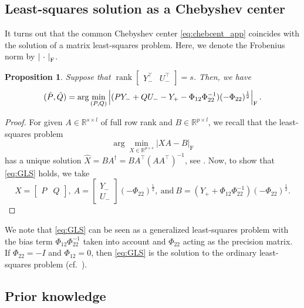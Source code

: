 \documentclass[pdflatex,sn-mathphys-num]{sn-jnl}%
\DeclareMathOperator{\rank}{rank}
\newcommand{\norm}[1]{\left|#1\right|}
\theoremstyle{thmstyleone}
\newtheorem{proposition}[theorem]{Proposition}
\begin{document}
\subsection{Least-squares solution as a Chebyshev center}
\label{subsec:LS}

It turns out that the common Chebyshev center \eqref{eq:chebcent_app} coincides with the solution of a matrix least-squares problem. Here, we denote the Frobenius norm by $\norm{\ \cdot\ }_\textup{F}$.
\begin{proposition}
Suppose that $\rank\begin{bmatrix}
Y_-^\top & U_-^\top
\end{bmatrix}=s$. Then, we have
\begin{equation}
\label{eq:GLS}
(\hat{P},\hat{Q})=\arg\min_{(P,Q)} \norm{(PY_-+QU_--Y_+-\Phi_{12}\Phi_{22}^{-1}) (-\Phi_{22})^{\frac{1}{2}}}_{\textup{F}}.
\end{equation}
\end{proposition}
\begin{proof}
For given $A\in\mathbb{R}^{s\times l}$ of full row rank and $B\in\mathbb{R}^{p\times l}$, we recall that the least-squares problem
\begin{equation}
\label{eq:LS}
\arg\min_{X\in\mathbb{R}^{p\times s}} |XA-B|_\text{F}
\end{equation}
has a unique solution $\hat{X}=BA^\dagger=BA^\top(AA^\top)^{-1}$, see \cite[Eq. (12.12)]{boyd2018introduction}. Now, to show that \eqref{eq:GLS} holds, we take
\begin{equation}
X=\begin{bmatrix}
P & Q
\end{bmatrix},\  A=\begin{bmatrix}
Y_- \\ U_-
\end{bmatrix}(-\Phi_{22})^{\frac{1}{2}},\ \text{and}\ B=(Y_++\Phi_{12}\Phi_{22}^{-1})(-\Phi_{22})^{\frac{1}{2}}.
\end{equation}
\end{proof}

We note that \eqref{eq:GLS} can be seen as a generalized least-squares problem with the bias term $\Phi_{12}\Phi_{22}^{-1}$ taken into account and $\Phi_{22}$ acting as the precision matrix. If \mbox{$\Phi_{22}=-I$} and $\Phi_{12}=0$, then \eqref{eq:GLS} is the solution to the ordinary least-squares problem \mbox{(cf. \cite{fogel1979system,bertsekas1971recursive,milanese1995properties})}. 


\subsection{Prior knowledge}
\end{document}
